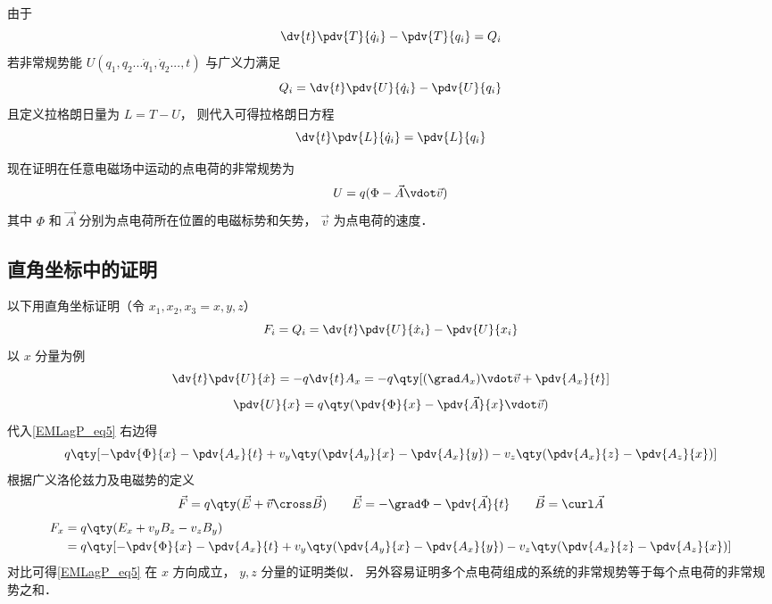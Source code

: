 
由于
\begin{equation}
\dv{t}\pdv{T}{\dot q_i} - \pdv{T}{q_i} = Q_i
\end{equation}
若非常规势能  $U(q_1, q_2...\dot q_1, \dot q_2..., t)$ 与广义力满足
\begin{equation}\label{EMLagP_eq2}
Q_i = \dv{t} \pdv{U}{\dot q_i} - \pdv{U}{q_i}
\end{equation}
且定义拉格朗日量为 $L = T - U$， 则代入可得拉格朗日方程
\begin{equation}
\dv{t} \pdv{L}{\dot q_i} = \pdv{L}{q_i}
\end{equation}

现在证明在任意电磁场中运动的点电荷的非常规势为
\begin{equation}\label{EMLagP_eq4}
U = q(\Phi  - \vec A \vdot \vec v)
\end{equation}
其中 $\Phi$ 和 $\vec A$ 分别为点电荷所在位置的电磁标势和矢势， $\vec v$ 为点电荷的速度．

\subsection{直角坐标中的证明}
以下用直角坐标证明（令 $x_1, x_2, x_3 = x,y,z$）
\begin{equation}\label{EMLagP_eq5}
F_i = Q_i =  \dv{t} \pdv{U}{\dot x_i} - \pdv{U}{x_i}
\end{equation}
以 $x$ 分量为例
\begin{equation}
\dv{t} \pdv{U}{\dot x} =  - q\dv{t} A_x =  - q\qty[ (\grad A_x) \vdot \vec v + \pdv{A_x}{t} ]
\end{equation}
\begin{equation}
\pdv{U}{x} = q\qty( \pdv{\Phi}{x} - \pdv{\vec A}{x} \vdot \vec v )
\end{equation}
代入\autoref{EMLagP_eq5} 右边得
\begin{equation}
q\qty[ -\pdv{\Phi}{x} - \pdv{A_x}{t} + v_y \qty( \pdv{A_y}{x} - \pdv{A_x}{y} ) - v_z \qty( \pdv{A_x}{z} - \pdv{A_z}{x}) ]
\end{equation} 
根据广义洛伦兹力及电磁势的定义
\begin{equation}
\vec F = q\qty(\vec E + \vec v \cross \vec B)
\qquad
\vec E =  - \grad \Phi  - \pdv{\vec A}{t}
\qquad
\vec B = \curl \vec A
\end{equation}
\begin{equation}\begin{aligned}
F_x &= q \qty(E_x + v_y B_z - v_z B_y) \\
&= q\qty[ - \pdv{\Phi}{x} - \pdv{A_x}{t} + v_y \qty(\pdv{A_y}{x} - \pdv{A_x}{y}) - v_z \qty( \pdv{A_x}{z} - \pdv{A_z}{x}) ]
\end{aligned}\end{equation}
对比可得\autoref{EMLagP_eq5} 在 $x$ 方向成立， $y,z$ 分量的证明类似． 另外容易证明多个点电荷组成的系统的非常规势等于每个点电荷的非常规势之和．

